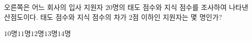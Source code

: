 \noindent\begin{minipage}[t]{0.58\linewidth}\vspace{0pt}\raggedright 오른쪽은 어느 회사의 입사 지원자 $20$명의 태도 점수와 지식 점수를 조사하여 나타낸 산점도이다. 태도 점수와 지식 점수의 차가 $2$점 이하인 지원자는 몇 명인가?\end{minipage}\hfill\begin{minipage}[t]{0.4\linewidth}\vspace{0pt}\centering \resizebox{\ifdim\width>\linewidth\linewidth\else\width\fi}{!}{}\end{minipage}\par
\begin{choices32}{$10$명}{$11$명}{$12$명}{$13$명}{$14$명}\end{choices32}
